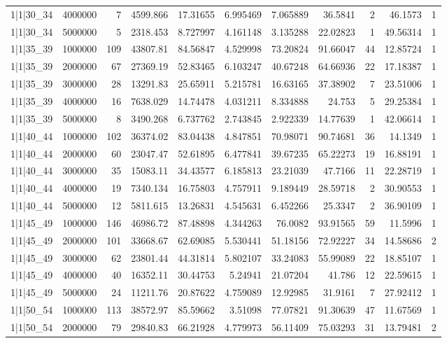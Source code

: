 \begin{tabular}{lrrrrrrrrrr}
1|1|30\_34 & 4000000 & 7 & 4599.866 & 17.31655 & 6.995469 & 7.065889 & 36.5841 & 2 & 46.1573 & 1 \\
1|1|30\_34 & 5000000 & 5 & 2318.453 & 8.727997 & 4.161148 & 3.135288 & 22.02823 & 1 & 49.56314 & 1 \\
1|1|35\_39 & 1000000 & 109 & 43807.81 & 84.56847 & 4.529998 & 73.20824 & 91.66047 & 44 & 12.85724 & 1 \\
1|1|35\_39 & 2000000 & 67 & 27369.19 & 52.83465 & 6.103247 & 40.67248 & 64.66936 & 22 & 17.18387 & 1 \\
1|1|35\_39 & 3000000 & 28 & 13291.83 & 25.65911 & 5.215781 & 16.63165 & 37.38902 & 7 & 23.51006 & 1 \\
1|1|35\_39 & 4000000 & 16 & 7638.029 & 14.74478 & 4.031211 & 8.334888 & 24.753 & 5 & 29.25384 & 1 \\
1|1|35\_39 & 5000000 & 8 & 3490.268 & 6.737762 & 2.743845 & 2.922339 & 14.77639 & 1 & 42.06614 & 1 \\
1|1|40\_44 & 1000000 & 102 & 36374.02 & 83.04438 & 4.847851 & 70.98071 & 90.74681 & 36 & 14.1349 & 1 \\
1|1|40\_44 & 2000000 & 60 & 23047.47 & 52.61895 & 6.477841 & 39.67235 & 65.22273 & 19 & 16.88191 & 1 \\
1|1|40\_44 & 3000000 & 35 & 15083.11 & 34.43577 & 6.185813 & 23.21039 & 47.7166 & 11 & 22.28719 & 1 \\
1|1|40\_44 & 4000000 & 19 & 7340.134 & 16.75803 & 4.757911 & 9.189449 & 28.59718 & 2 & 30.90553 & 1 \\
1|1|40\_44 & 5000000 & 12 & 5811.615 & 13.26831 & 4.545631 & 6.452266 & 25.3347 & 2 & 36.90109 & 1 \\
1|1|45\_49 & 1000000 & 146 & 46986.72 & 87.48898 & 4.344263 & 76.0082 & 93.91565 & 59 & 11.5996 & 1 \\
1|1|45\_49 & 2000000 & 101 & 33668.67 & 62.69085 & 5.530441 & 51.18156 & 72.92227 & 34 & 14.58686 & 2 \\
1|1|45\_49 & 3000000 & 62 & 23801.44 & 44.31814 & 5.802107 & 33.24083 & 55.99089 & 22 & 18.85107 & 1 \\
1|1|45\_49 & 4000000 & 40 & 16352.11 & 30.44753 & 5.24941 & 21.07204 & 41.786 & 12 & 22.59615 & 1 \\
1|1|45\_49 & 5000000 & 24 & 11211.76 & 20.87622 & 4.759089 & 12.92985 & 31.9161 & 7 & 27.92412 & 1 \\
1|1|50\_54 & 1000000 & 113 & 38572.97 & 85.59662 & 3.51098 & 77.07821 & 91.30639 & 47 & 11.67569 & 1 \\
1|1|50\_54 & 2000000 & 79 & 29840.83 & 66.21928 & 4.779973 & 56.11409 & 75.03293 & 31 & 13.79481 & 2 \\

\end{tabular}
